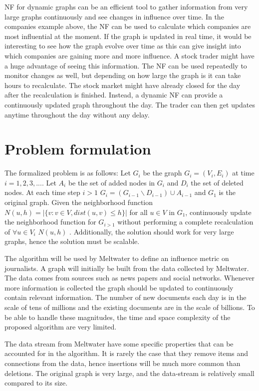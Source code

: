NF for dynamic graphs can be an efficient tool to gather information from very large graphs continuously and see changes in influence over time. In the companies example above, the NF can be used to calculate which companies are most influential at the moment. If the graph is updated in real time, it would be interesting to see how the graph evolve over time as this can give insight into which companies are gaining more and more influence. A stock trader might have a huge advantage of seeing this information. The NF can be used repeatedly to monitor changes as well, but depending on how large the graph is it can take hours to recalculate. The stock market might have already closed for the day after the recalculation is finished. Instead, a dynamic NF can provide a continuously updated graph throughout the day. The trader can then get updates anytime throughout the day without any delay.

\section{Problem formulation}
The formalized problem is as follows: 
Let $G_i$ be the graph $G_i = (V_i,E_i)$ at time $i = 1,2,3,...$.
Let $A_i$ be the set of added nodes in $G_i$ and $D_i$ the set of deleted nodes. 
At each time step $i > 1$ $G_i = (G_{i-1} \backslash D_{i-1}) \cup A_{i-1}$ and $G_1$ is the original graph. Given the neighborhood function $N(u, h) = |\{v : v \in V, dist(u,v) \leq h \}|$ for all $u \in V$ in $G_1$, continuously update the neighborhood function for $G_{i>1}$ without performing a complete recalculation of $\forall u \in V_i$ $N(u, h)$ . Additionally, the solution should work for very large graphs, hence the solution must be scalable. 

The algorithm will be used by Meltwater to define an influence metric on journalists. A graph will initially be built from the data collected by Meltwater. The data comes from sources such as news papers and social networks. Whenever more information is collected the graph should be updated to continuously contain relevant information. The number of new documents each day is in the scale of tens of millions and the existing documents are in the scale of billions. To be able to handle these magnitudes, the time and space complexity of the proposed algorithm are very limited.

The data stream from Meltwater have some specific properties that can be accounted for in the algorithm. It is rarely the case that they remove items and connections from the data, hence insertions will be much more common than deletions. The original graph is very large, and the data-stream is relatively small compared to its size. 

